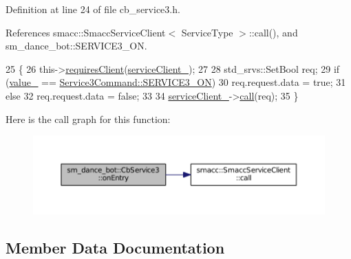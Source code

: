 Definition at line 24 of file cb\+\_\+service3.\+h.



References smacc\+::\+Smacc\+Service\+Client$<$ Service\+Type $>$\+::call(), and sm\+\_\+dance\+\_\+bot\+::\+S\+E\+R\+V\+I\+C\+E3\+\_\+\+ON.


\begin{DoxyCode}
25   \{
26     this->\hyperlink{classsmacc_1_1SmaccClientBehavior_adc21bbd45d36bd81ca6f778ed161807a}{requiresClient}(\hyperlink{classsm__dance__bot_1_1CbService3_a23064503560f82cf5d6e24e393c2aa9c}{serviceClient\_});
27 
28     std\_srvs::SetBool req;
29     \textcolor{keywordflow}{if} (\hyperlink{classsm__dance__bot_1_1CbService3_a82b3136997a198b0c880ef1b170e7502}{value\_} == \hyperlink{namespacesm__dance__bot_a2d0902aa29698165effd2c3248a9c8ffa13cdca48a01bbb44fa8fb35567fbc58e}{Service3Command::SERVICE3\_ON})
30       req.request.data = \textcolor{keyword}{true};
31     \textcolor{keywordflow}{else}
32       req.request.data = \textcolor{keyword}{false};
33 
34     \hyperlink{classsm__dance__bot_1_1CbService3_a23064503560f82cf5d6e24e393c2aa9c}{serviceClient\_}->\hyperlink{classsmacc_1_1SmaccServiceClient_a1b749ce13f3cb1dbf10a5992c05c173e}{call}(req);
35   \}
\end{DoxyCode}


Here is the call graph for this function\+:
\nopagebreak
\begin{figure}[H]
\begin{center}
\leavevmode
\includegraphics[width=350pt]{classsm__dance__bot_1_1CbService3_ad55a19f6755b493f9cef0f7620cd382c_cgraph}
\end{center}
\end{figure}




\subsection{Member Data Documentation}

